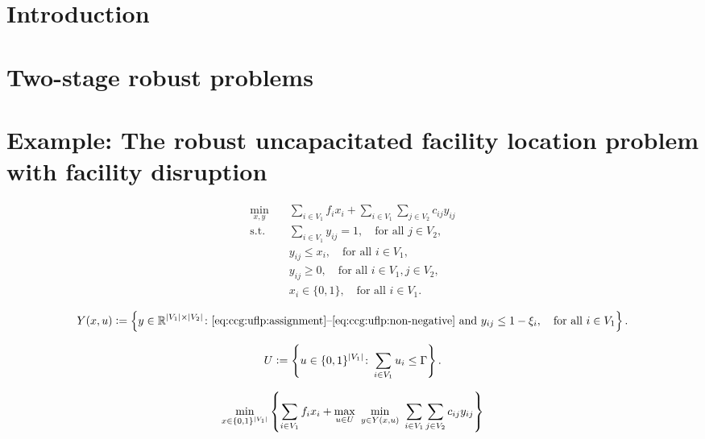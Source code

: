 \section{Introduction}

\section{Two-stage robust problems}

\section{Example: The robust uncapacitated facility location problem with facility disruption}


\begin{subequations}
    \begin{align}
        \min_{x,y} \quad & \sum_{i\in V_1} f_ix_i + \sum_{i\in V_1} \sum_{j\in V_2} c_{ij} y_{ij} \\
        \text{s.t.} \quad & \sum_{i\in V_1} y_{ij} = 1, \quad \text{for all } j\in V_2, \label{eq:ccg:uflp:assignment} \\
        & y_{ij} \le x_i, \quad \text{for all } i\in V_1,  \label{eq:ccg:uflp:activation} \\
        & y_{ij} \ge 0, \quad \text{for all } i\in V_1, j\in V_2, \label{eq:ccg:uflp:non-negative} \\
        & x_i\in\{0,1\}, \quad \text{for all } i\in V_1.
    \end{align}
\end{subequations}

\begin{equation*}
    Y(x,u) \mathrel{{\mathop:}{=}} \left\{ y\in\mathbb{R}^{|V_1|\times|V_2|} \colon
    \text{\eqref{eq:ccg:uflp:assignment}--\eqref{eq:ccg:uflp:non-negative} and }
    y_{ij} \le 1 - \xi_i, \quad \text{for all }i\in V_1 \right\}.
\end{equation*}

\begin{equation*}
    U \mathrel{{\mathop:}{=}} \left\{ u\in\{0,1\}^{|V_1|} \colon \sum_{i\in V_1} u_i \le \Gamma \right\}.
\end{equation*}

\begin{equation*}
    \min_{x\in\{0,1\}^{|V_1|}} \Set{
        \sum_{i\in V_1} f_ix_i +
        \max_{u\in U} \ 
        \min_{ y\in Y(x,u) } \ 
        \sum_{i\in V_1} \sum_{j\in V_2} c_{ij} y_{ij}
    }
\end{equation*}

